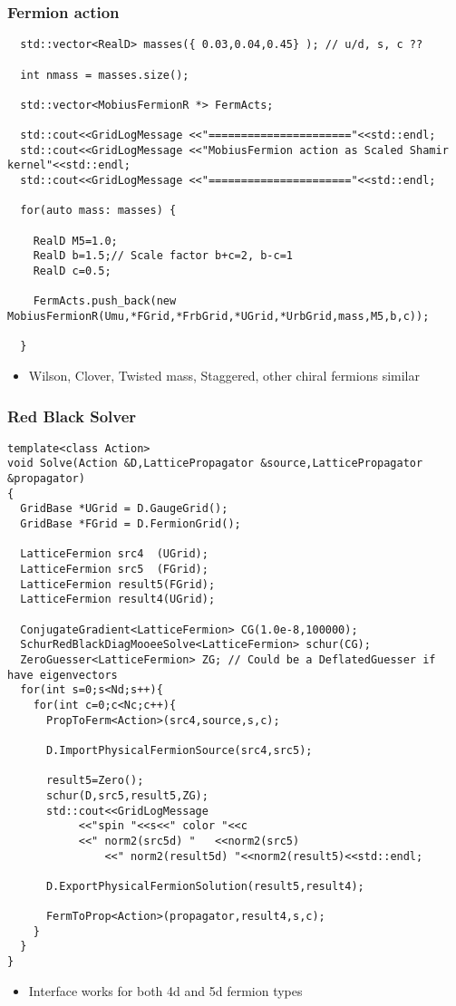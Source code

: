 \documentclass[pdf,ps,8pt]{beamer}
\begin{document}
\begin{frame}[fragile]\small\frametitle{Fermion action}

{\tiny
\begin{verbatim}
  std::vector<RealD> masses({ 0.03,0.04,0.45} ); // u/d, s, c ??

  int nmass = masses.size();

  std::vector<MobiusFermionR *> FermActs;
  
  std::cout<<GridLogMessage <<"======================"<<std::endl;
  std::cout<<GridLogMessage <<"MobiusFermion action as Scaled Shamir kernel"<<std::endl;
  std::cout<<GridLogMessage <<"======================"<<std::endl;

  for(auto mass: masses) {

    RealD M5=1.0;
    RealD b=1.5;// Scale factor b+c=2, b-c=1
    RealD c=0.5;
    
    FermActs.push_back(new MobiusFermionR(Umu,*FGrid,*FrbGrid,*UGrid,*UrbGrid,mass,M5,b,c));
   
  }
\end{verbatim}
}
\begin{itemize}
\item Wilson, Clover, Twisted mass, Staggered, other chiral fermions similar
\end{itemize}
\end{frame}

\begin{frame}[fragile]\small\frametitle{Red Black Solver}

{\tiny
\begin{verbatim}
template<class Action>
void Solve(Action &D,LatticePropagator &source,LatticePropagator &propagator)
{
  GridBase *UGrid = D.GaugeGrid();
  GridBase *FGrid = D.FermionGrid();

  LatticeFermion src4  (UGrid); 
  LatticeFermion src5  (FGrid); 
  LatticeFermion result5(FGrid);
  LatticeFermion result4(UGrid);
  
  ConjugateGradient<LatticeFermion> CG(1.0e-8,100000);
  SchurRedBlackDiagMooeeSolve<LatticeFermion> schur(CG);
  ZeroGuesser<LatticeFermion> ZG; // Could be a DeflatedGuesser if have eigenvectors
  for(int s=0;s<Nd;s++){
    for(int c=0;c<Nc;c++){
      PropToFerm<Action>(src4,source,s,c);

      D.ImportPhysicalFermionSource(src4,src5);

      result5=Zero();
      schur(D,src5,result5,ZG);
      std::cout<<GridLogMessage
	       <<"spin "<<s<<" color "<<c
	       <<" norm2(src5d) "   <<norm2(src5)
               <<" norm2(result5d) "<<norm2(result5)<<std::endl;

      D.ExportPhysicalFermionSolution(result5,result4);

      FermToProp<Action>(propagator,result4,s,c);
    }
  }
}
\end{verbatim}
}  
\begin{itemize}
\item Interface works for both 4d and 5d fermion types
\end{itemize}
\end{frame}
\end{document}
